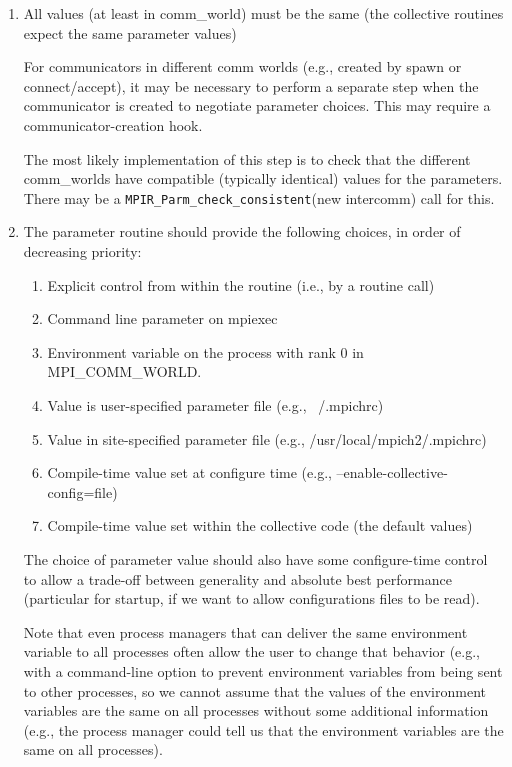 \documentclass{report}
\begin{document}
\begin{enumerate}
\item All values (at least in comm\_world) must be the same (the
      collective routines expect the same parameter values)


      For communicators in different comm worlds (e.g., created by
      spawn or connect/accept), it may be necessary to perform a
      separate step when the communicator is created to negotiate
      parameter choices.  This may require a communicator-creation
      hook.

      The most likely implementation of this step is to check that the
      different comm\_worlds have compatible (typically identical)
      values for the parameters.  There may be a
      \texttt{MPIR\_Parm\_check\_consistent}(new intercomm) call for this.

\item The parameter routine should provide the following choices, in
      order of decreasing priority:
     
\begin{enumerate}
\item Explicit control from within the routine (i.e., by a routine
      call)
\item Command line parameter on mpiexec
\item Environment variable on the process with rank 0 in MPI\_COMM\_WORLD.
\item Value is user-specified parameter file (e.g., ~/.mpichrc)
\item Value in site-specified parameter file (e.g.,
      /usr/local/mpich2/.mpichrc)
\item Compile-time value set at configure time (e.g.,
      --enable-collective-config=file) 
\item Compile-time value set within the collective code (the
      default values)
\end{enumerate}
      The choice of parameter value should also have some configure-time
      control to allow a trade-off between generality and absolute
      best performance (particular for startup, if we want to allow
      configurations files to be read).

      Note that even process managers that can deliver the same
      environment variable to all processes often allow the user to
      change that behavior (e.g., with a command-line option to
      prevent environment variables from being sent to other
      processes, so we cannot assume that the values of the
      environment variables are the same on all processes without some
      additional information (e.g., the process manager could tell us
      that the environment variables are the same on all processes).


\end{enumerate}
\end{document}
